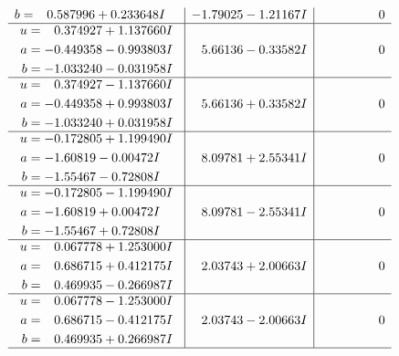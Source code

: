 \documentclass[1p]{elsarticle_modified}
\theoremstyle{definition}
\begin{document}
$$\begin{array}{c|c|c}
\begin{aligned}
b &= \phantom{-}0.587996 + 0.233648 I\end{aligned}
 & -1.79025 - 1.21167 I & \phantom{-0.000000 } 0 \\ \hline\begin{aligned}
u &= \phantom{-}0.374927 + 1.137660 I \\
a &= -0.449358 - 0.993803 I \\
b &= -1.033240 - 0.031958 I\end{aligned}
 & \phantom{-}5.66136 - 0.33582 I & \phantom{-0.000000 } 0 \\ \hline\begin{aligned}
u &= \phantom{-}0.374927 - 1.137660 I \\
a &= -0.449358 + 0.993803 I \\
b &= -1.033240 + 0.031958 I\end{aligned}
 & \phantom{-}5.66136 + 0.33582 I & \phantom{-0.000000 } 0 \\ \hline\begin{aligned}
u &= -0.172805 + 1.199490 I \\
a &= -1.60819 - 0.00472 I \\
b &= -1.55467 - 0.72808 I\end{aligned}
 & \phantom{-}8.09781 + 2.55341 I & \phantom{-0.000000 } 0 \\ \hline\begin{aligned}
u &= -0.172805 - 1.199490 I \\
a &= -1.60819 + 0.00472 I \\
b &= -1.55467 + 0.72808 I\end{aligned}
 & \phantom{-}8.09781 - 2.55341 I & \phantom{-0.000000 } 0 \\ \hline\begin{aligned}
u &= \phantom{-}0.067778 + 1.253000 I \\
a &= \phantom{-}0.686715 + 0.412175 I \\
b &= \phantom{-}0.469935 - 0.266987 I\end{aligned}
 & \phantom{-}2.03743 + 2.00663 I & \phantom{-0.000000 } 0 \\ \hline\begin{aligned}
u &= \phantom{-}0.067778 - 1.253000 I \\
a &= \phantom{-}0.686715 - 0.412175 I \\
b &= \phantom{-}0.469935 + 0.266987 I\end{aligned}
 & \phantom{-}2.03743 - 2.00663 I & \phantom{-0.000000 } 0\\
 \hline 
 \end{array}$$\newpage$$\begin{array}{c|c|c}  

\end{array}$$
\end{document}
